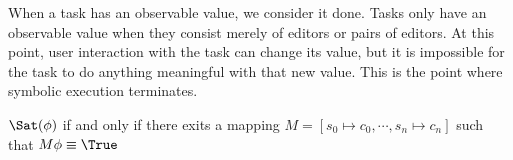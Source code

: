 When a task has an observable value, we consider it done.
Tasks only have an observable value when they consist merely of editors or pairs of editors.
At this point, user interaction with the task can change its value, but it is impossible for the task to do anything meaningful with that new value.
This is the point where symbolic execution terminates.



\begin{definition}
  \label{def:Sat}
  $\Sat(\phi)$ if and only if there exits a mapping $M=[s_0\mapsto c_0,\cdots,s_n\mapsto c_n]$ such that $M\phi\equiv\True$
\end{definition}
